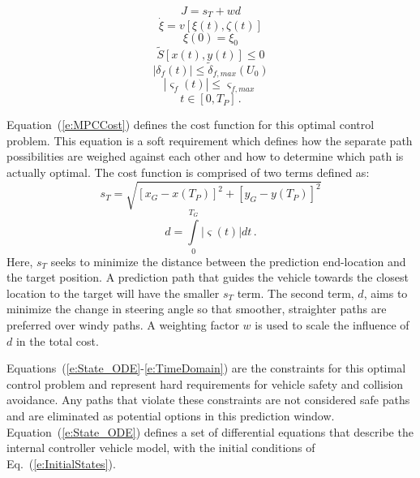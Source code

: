 \documentclass[12pt,onecolumn]{article}
\begin{document}
\begin{equation}\label{e:MPCCost}
J = s_T + wd 
\end{equation}
\begin{equation}\label{e:State_ODE}
\dot{\xi} = v\left[\xi\left(t\right),\zeta\left(t\right)\right] 
\end{equation}
\begin{equation}\label{e:InitialStates}
\xi\left(0\right) = \xi_0 
\end{equation}
\begin{equation}\label{e:SafeArea}
\tilde{S}\left[x\left(t\right),y\left(t\right)\right] \leq0  
\end{equation}
\begin{equation}\label{e:SteerLimit}
\left|\delta_f\left(t\right)\right| \leq\tilde{\delta}_{f,max}\left(U_0\right) 
\end{equation}
\begin{equation}\label{e:SteerRateLimit}
\left|\varsigma_f\left(t\right)\right| \leq\varsigma_{f,max} 
\end{equation}
\begin{equation}\label{e:TimeDomain}
t \in \left[0,T_P\right] \,.
\end{equation}

Equation~(\ref{e:MPCCost}) defines the cost function for this optimal control problem. This equation is a soft requirement which defines how the separate path possibilities are weighed against each other and how to determine which path is actually optimal. The cost function is comprised of two terms defined as:
%
\begin{equation}\label{e:DistanceCost}
s_T = \sqrt{\left[ x_G - x\left(T_P\right)\right]^2 + \left[y_G - y\left(T_P\right)\right]^2 }
\end{equation}
\begin{equation}\label{e:TurningCost}
d = \int \limits_0^{T_G} \left|\varsigma\left(t\right)\right| dt \,.
\end{equation}
%
Here, $s_{T}$ seeks to minimize the distance between the prediction end-location and the target position. A prediction path that guides the vehicle towards the closest location to the target will have the smaller $s_{T}$ term. The second term, $d$, aims to minimize the change in steering angle so that smoother, straighter paths are preferred over windy paths. A weighting factor $w$ is used to scale the influence of $d$ in the total cost.

Equations~(\ref{e:State_ODE}-\ref{e:TimeDomain}) are the constraints for this optimal control problem and represent hard requirements for vehicle safety and collision avoidance. Any paths that violate these constraints are not considered safe paths and are eliminated as potential options in this prediction window. Equation~(\ref{e:State_ODE}) defines a set of differential equations that describe the internal controller vehicle model, with the initial conditions of Eq.~(\ref{e:InitialStates}).
\end{document}
